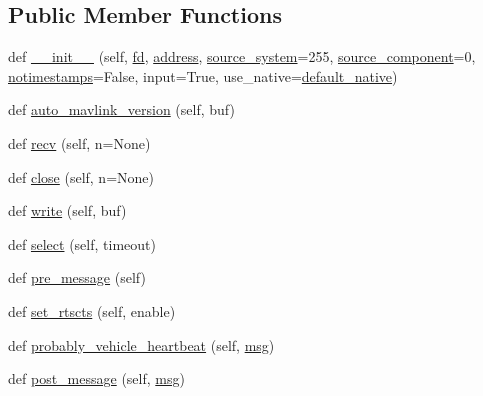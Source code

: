 \subsection*{Public Member Functions}
\begin{DoxyCompactItemize}
\item 
def \mbox{\hyperlink{classpymavlink_1_1mavutil_1_1mavfile_aa1179c2610a2cb4af6884cb853da74ec}{\+\_\+\+\_\+init\+\_\+\+\_\+}} (self, \mbox{\hyperlink{classpymavlink_1_1mavutil_1_1mavfile_a157775ad737f937ae736cbf039f367aa}{fd}}, \mbox{\hyperlink{classpymavlink_1_1mavutil_1_1mavfile_a3307e42a1f2ad53909dca6f9a232760c}{address}}, \mbox{\hyperlink{classpymavlink_1_1mavutil_1_1mavfile_a02c06667c79f4414ed9c4ee6a8dec903}{source\+\_\+system}}=255, \mbox{\hyperlink{classpymavlink_1_1mavutil_1_1mavfile_a84e307f771a9ac2aed567831845c417e}{source\+\_\+component}}=0, \mbox{\hyperlink{classpymavlink_1_1mavutil_1_1mavfile_a2743806ba71f58e0dc8a98d76e07f7c9}{notimestamps}}=False, input=True, use\+\_\+native=\mbox{\hyperlink{namespacepymavlink_1_1mavutil_a21ce9da7b698a7bc21c44b9f77341b62}{default\+\_\+native}})
\item 
def \mbox{\hyperlink{classpymavlink_1_1mavutil_1_1mavfile_af0f0faf1986ca88353787674f7575862}{auto\+\_\+mavlink\+\_\+version}} (self, buf)
\item 
def \mbox{\hyperlink{classpymavlink_1_1mavutil_1_1mavfile_a09cb800fc6b03949ace05ce320539be2}{recv}} (self, n=None)
\item 
def \mbox{\hyperlink{classpymavlink_1_1mavutil_1_1mavfile_a83f651dbc2487f6e45599e69d080ef1e}{close}} (self, n=None)
\item 
def \mbox{\hyperlink{classpymavlink_1_1mavutil_1_1mavfile_a8f40348c156083384c07dfa73cf92a62}{write}} (self, buf)
\item 
def \mbox{\hyperlink{classpymavlink_1_1mavutil_1_1mavfile_a205cfc15609088ced70b140c33c2c6d3}{select}} (self, timeout)
\item 
def \mbox{\hyperlink{classpymavlink_1_1mavutil_1_1mavfile_ad0ea96f4450b27d0327d9060d55e05be}{pre\+\_\+message}} (self)
\item 
def \mbox{\hyperlink{classpymavlink_1_1mavutil_1_1mavfile_a2607aae0fda1190034889d9e1c585539}{set\+\_\+rtscts}} (self, enable)
\item 
def \mbox{\hyperlink{classpymavlink_1_1mavutil_1_1mavfile_aa3ceb80a2e7c62fdfc87c27c278261b9}{probably\+\_\+vehicle\+\_\+heartbeat}} (self, \mbox{\hyperlink{stratnode_8cpp_a82cfe4ed9bc9e1b07c8bf209c324d85b}{msg}})
\item 
def \mbox{\hyperlink{classpymavlink_1_1mavutil_1_1mavfile_a6307d32e7cc751320cb1fe84a1a43049}{post\+\_\+message}} (self, \mbox{\hyperlink{stratnode_8cpp_a82cfe4ed9bc9e1b07c8bf209c324d85b}{msg}})

\end{DoxyCompactItemize}
